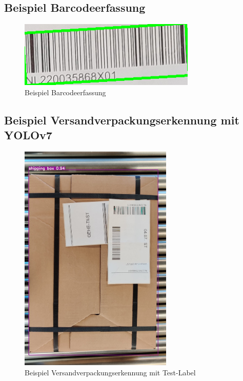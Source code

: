 \subsection{Beispiel Barcodeerfassung}

\begin{figure}[htpb]
  \centering
  \includegraphics[width=0.75\textwidth]{./pics/barcode.png}
  \caption{Beispiel Barcodeerfassung}
  \label{appendix:fig:barcode}
\end{figure}


\newpage
\subsection{Beispiel Versandverpackungserkennung mit YOLOv7}

\begin{figure}[htpb]
  \centering
  \includegraphics[width=0.65\textwidth]{./pics/detectShippingBox.jpg}
  \caption{Beispiel Versandverpackungserkennung mit Test-Label}
  \label{appendix:fig:yoloDetect}
\end{figure}



